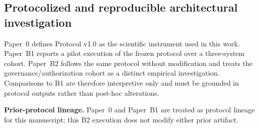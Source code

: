 \subsection{Protocolized and reproducible architectural investigation}
Paper~0 defines Protocol v1.0 as the scientific instrument used in this work. Paper~B1 reports a pilot execution of the frozen protocol over a three-system cohort. Paper~B2 follows the same protocol without modification and treats the governance/authorization cohort as a distinct empirical investigation. Comparisons to B1 are therefore interpretive only and must be grounded in protocol outputs rather than post-hoc alterations.

\textbf{Prior-protocol lineage.} Paper~0 and Paper~B1 are treated as protocol lineage for this manuscript; this B2 execution does not modify either prior artifact.
